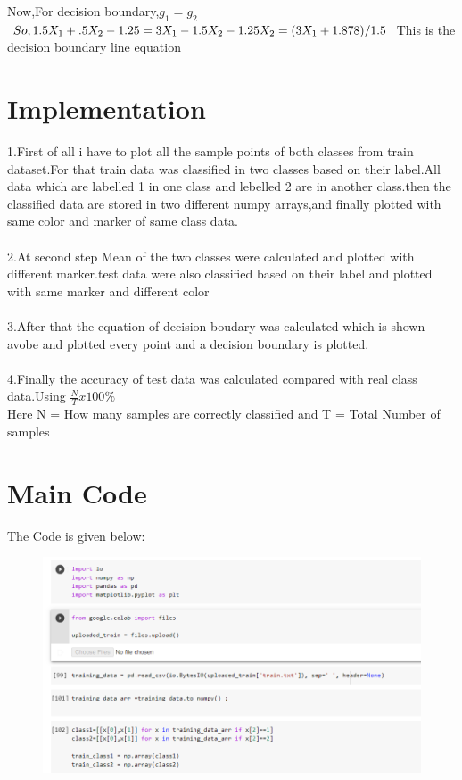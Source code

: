 \documentclass[12pt]{article}
\begin{document}
Now,For decision boundary,$ g_1 = g_2$\\

$So, \\1.5X_1 + .5X_2 -1.25 =  3X_1 -1.5X_2 -1.25\\\\
X_2 = (3X_1 + 1.878)/1.5\\$
This is the decision boundary line equation
\newpage

\section{Implementation}
1.First of all i have to plot all the sample points of both classes from train dataset.For that train data was classified in two classes based on their label.All data which are labelled 1 in one class and lebelled 2 are in another class.then the classified data are stored in two different numpy arrays,and finally plotted  with same color and marker of same class data.\\\\
2.At second step Mean of the two classes were calculated and plotted with different marker.test data were also classified based on their label and plotted with same marker and different color\\\\
3.After that the equation of decision boudary was calculated which is shown avobe and plotted every point and a decision boundary is plotted.\\\\
4.Finally the accuracy of test data was calculated compared with real class data.Using $\frac{N}{T}x100\%\ $ \\
Here N = How many samples are correctly classified and T = Total Number of samples

\newpage



\section{Main Code}
The Code is given below:



\begin{figure}[H]
\includegraphics[scale = .7]{p1.PNG}
\end{figure}
\end{document}

